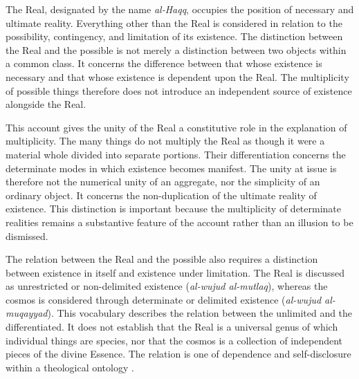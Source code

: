 \label{para:VS.B01.P01.C08.S16.SS03.P002}

The Real, designated by the name \textit{al-Haqq}, occupies
the position of necessary and ultimate reality. Everything
other than the Real is considered in relation to the
possibility, contingency, and limitation of its existence.
The distinction between the Real and the possible is not
merely a distinction between two objects within a common
class. It concerns the difference between that whose
existence is necessary and that whose existence is dependent
upon the Real. The multiplicity of possible things therefore
does not introduce an independent source of existence
alongside the Real.

\label{para:VS.B01.P01.C08.S16.SS03.P003}

This account gives the unity of the Real a constitutive
role in the explanation of multiplicity. The many things
do not multiply the Real as though it were a material
whole divided into separate portions. Their differentiation
concerns the determinate modes in which existence becomes
manifest. The unity at issue is therefore not the numerical
unity of an aggregate, nor the simplicity of an ordinary
object. It concerns the non-duplication of the ultimate
reality of existence. This distinction is important because
the multiplicity of determinate realities remains a
substantive feature of the account rather than an illusion
to be dismissed.

\label{para:VS.B01.P01.C08.S16.SS03.P004}

The relation between the Real and the possible also
requires a distinction between existence in itself and
existence under limitation. The Real is discussed as
unrestricted or non-delimited existence
(\textit{al-wujud al-mutlaq}), whereas the cosmos is
considered through determinate or delimited existence
(\textit{al-wujud al-muqayyad}). This vocabulary describes
the relation between the unlimited and the differentiated.
It does not establish that the Real is a universal genus
of which individual things are species, nor that the
cosmos is a collection of independent pieces of the
divine Essence. The relation is one of dependence and
self-disclosure within a theological ontology
\citep[3:162.23]{IbnArabiFutuhat1911}.



